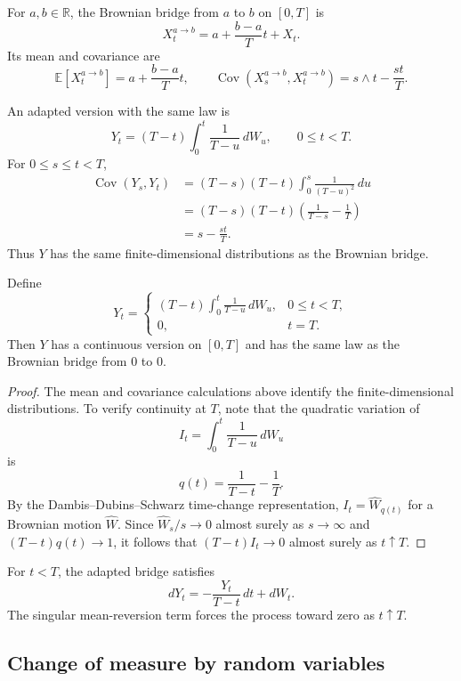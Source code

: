 \begin{de}
For $a,b\in\mathbb{R}$, the Brownian bridge from $a$ to $b$ on $[0,T]$ is
\[
X_t^{a\to b}
=
a+\frac{b-a}{T}t+X_t.
\]
Its mean and covariance are
\[
\mathbb{E}[X_t^{a\to b}]
=a+\frac{b-a}{T}t,
\qquad
\operatorname{Cov}(X_s^{a\to b},X_t^{a\to b})
=s\wedge t-\frac{st}{T}.
\]
\end{de}

An adapted version with the same law is
\[
Y_t
=
(T-t)\int_0^t\frac{1}{T-u}\,dW_u,
\qquad 0\leq t<T.
\]
For $0\leq s\leq t<T$,
\[
\begin{aligned}
\operatorname{Cov}(Y_s,Y_t)
&=(T-s)(T-t)
\int_0^s\frac{1}{(T-u)^2}\,du\\
&=(T-s)(T-t)
\left(\frac{1}{T-s}-\frac{1}{T}\right)\\
&=s-\frac{st}{T}.
\end{aligned}
\]
Thus $Y$ has the same finite-dimensional distributions as the Brownian bridge.

\begin{thm}
Define
\[
Y_t=
\begin{cases}
(T-t)\displaystyle\int_0^t\frac{1}{T-u}\,dW_u,
&0\leq t<T,\\[1.2ex]
0,&t=T.
\end{cases}
\]
Then $Y$ has a continuous version on $[0,T]$ and has the same law as the Brownian bridge from $0$ to $0$.
\end{thm}

\begin{proof}
The mean and covariance calculations above identify the finite-dimensional distributions. To verify continuity at $T$, note that the quadratic variation of
\[
I_t=\int_0^t\frac{1}{T-u}\,dW_u
\]
is
\[
q(t)=\frac{1}{T-t}-\frac1T.
\]
By the Dambis--Dubins--Schwarz time-change representation, $I_t=\widehat W_{q(t)}$ for a Brownian motion $\widehat W$. Since $\widehat W_s/s\to0$ almost surely as $s\to\infty$ and $(T-t)q(t)\to1$, it follows that $(T-t)I_t\to0$ almost surely as $t\uparrow T$.
\end{proof}

\begin{remark}
For $t<T$, the adapted bridge satisfies
\[
dY_t=-\frac{Y_t}{T-t}\,dt+dW_t.
\]
The singular mean-reversion term forces the process toward zero as $t\uparrow T$.
\end{remark}

\subsection{Change of measure by random variables}

